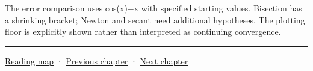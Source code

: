 The error comparison uses cos(x)−x with specified starting values. Bisection has a shrinking bracket; Newton and secant need additional hypotheses. The plotting floor is explicitly shown rather than interpreted as continuing convergence.

\begin{center}\rule{0.5\linewidth}{0.5pt}\end{center}

\hyperref[volume-reading-map]{Reading map} · \hyperref[02-foundations-ii-ch027-gaussnewton-for-geometry-and-pose]{Previous chapter} · \hyperref[02-foundations-ii-ch029-discretization-convergence-and-experimental-design]{Next chapter}
